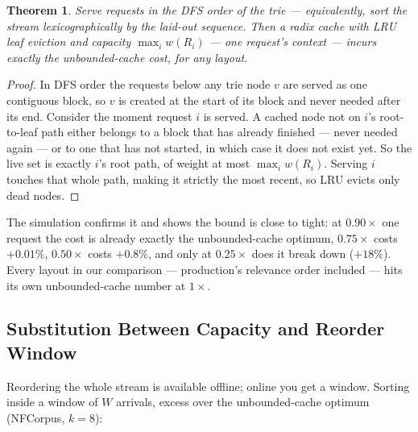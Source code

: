 \documentclass[11pt]{article}
\theoremstyle{plain}
\newtheorem{theorem}{Theorem}
\begin{document}
\begin{theorem}
Serve requests in the DFS order of the trie --- equivalently, sort the stream lexicographically by the laid-out sequence. Then a radix cache with LRU leaf eviction and capacity $\max_i w(R_i)$ --- \emph{one request's context} --- incurs exactly the unbounded-cache cost, for any layout.
\end{theorem}
\begin{proof}
In DFS order the requests below any trie node $v$ are served as one contiguous block, so $v$ is created at the start of its block and never needed after its end. Consider the moment request $i$ is served. A cached node not on $i$'s root-to-leaf path either belongs to a block that has already finished --- never needed again --- or to one that has not started, in which case it does not exist yet. So the live set is exactly $i$'s root path, of weight at most $\max_i w(R_i)$. Serving $i$ touches that whole path, making it strictly the most recent, so LRU evicts only dead nodes. 
\end{proof}

The simulation confirms it and shows the bound is close to tight: at $0.90\times$ one request the cost is already exactly the unbounded-cache optimum, $0.75\times$ costs $+0.01\%$, $0.50\times$ costs $+0.8\%$, and only at $0.25\times$ does it break down ($+18\%$). Every layout in our comparison --- production's relevance order included --- hits its own unbounded-cache number at $1\times$.

\subsection{Substitution Between Capacity and Reorder Window}

Reordering the whole stream is available offline; online you get a window. Sorting inside a window of $W$ arrivals, excess over the unbounded-cache optimum (NFCorpus, $k=8$):

\begin{center}\small
{}\end{center}
\end{document}
